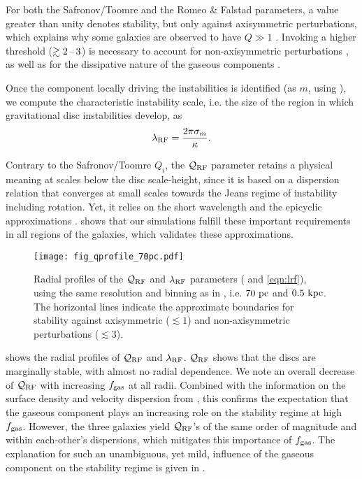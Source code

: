 \documentclass[useAMS,usenatbib]{mnras}
\newcommand{\fgas}{\ensuremath{f_{\rm gas}}\xspace}
\newcommand{\qrf}{\ensuremath{\mathcal{Q}_{\rm RF}}\xspace}
\newcommand{\lrf}{\ensuremath{\lambda_{\rm RF}}\xspace}
\begin{document}
For both the Safronov/Toomre and the Romeo \& Falstad parameters, a value greater than unity denotes stability, but only against axisymmetric perturbations, which explains why some galaxies are observed to have $Q \gg 1$ \citep{Romeo2017}. Invoking a higher threshold ($\gtrsim 2\textrm{\,--\,} 3$) is necessary to account for non-axisymmetric perturbations \citep{Griv2012}, as well as for the dissipative nature of the gaseous components \citep{Elmegreen2011}.

Once the component locally driving the instabilities is identified (as $m$, using ), we compute the characteristic instability scale, i.e. the size of the region in which gravitational disc instabilities develop, as
\begin{equation}
\label{eqn:lrf}
\lrf = \frac{2\pi \sigma_m}{\kappa}.
\end{equation}

Contrary to the Safronov/Toomre $Q_i$, the \qrf parameter retains a physical meaning at scales below the disc scale-height, since it is based on a dispersion relation that converges at small scales towards the Jeans regime of instability including rotation. Yet, it relies on the short wavelength and the epicyclic approximations \citep{Binney2008, Romeo2013}.  shows that our simulations fulfill these important requirements in all regions of the galaxies, which validates these approximations.

\begin{figure}
\centering
\texttt{[image: fig\_qprofile\_70pc.pdf]}
\caption{Radial profiles of the \qrf and \lrf parameters ( and \ref{eqn:lrf}), using the same resolution and binning as in , i.e. $70 \mathrm{~pc}$ and $0.5 \mathrm{~kpc}$. The horizontal lines indicate the approximate boundaries for stability against axisymmetric ($\lesssim 1$) and non-axisymmetric perturbations ($\lesssim 3$).}
\label{fig:qprofile}
\end{figure}

 shows the radial profiles of \qrf and \lrf. \qrf shows that the discs are marginally stable, with almost no radial dependence. We note an overall decrease of \qrf with increasing \fgas at all radii. Combined with the information on the surface density and velocity dispersion from , this confirms the expectation that the gaseous component plays an increasing role on the stability regime at high \fgas. However, the three galaxies yield \qrf's of the same order of magnitude and within each-other's dispersions, which mitigates this importance of \fgas. The explanation for such an unambiguous, yet mild, influence of the gaseous component on the stability regime is given in .
\end{document}
